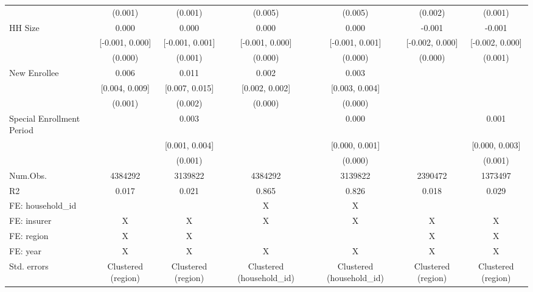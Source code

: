 \begin{table}[H]
\begin{table}[H]
\begin{tabular}[t]{lcccccc}
 & (0.001) & (0.001) & (0.005) & (0.005) & (0.002) & (0.001)\\
HH Size & 0.000 & 0.000 & 0.000 & 0.000 & -0.001 & -0.001\\
 & [-0.001, 0.000] & [-0.001, 0.001] & [-0.001, 0.000] & [-0.001, 0.001] & [-0.002, 0.000] & [-0.002, 0.000]\\
 & (0.000) & (0.001) & (0.000) & (0.000) & (0.000) & (0.001)\\
New Enrollee & 0.006 & 0.011 & 0.002 & 0.003 &  & \\
 & [0.004, 0.009] & [0.007, 0.015] & [0.002, 0.002] & [0.003, 0.004] &  & \\
 & (0.001) & (0.002) & (0.000) & (0.000) &  & \\
Special Enrollment Period &  & 0.003 &  & 0.000 &  & 0.001\\
 &  & [0.001, 0.004] &  & [0.000, 0.001] &  & [0.000, 0.003]\\
 &  & (0.001) &  & (0.000) &  & (0.001)\\
\midrule
Num.Obs. & 4384292 & 3139822 & 4384292 & 3139822 & 2390472 & 1373497\\
R2 & 0.017 & 0.021 & 0.865 & 0.826 & 0.018 & 0.029\\
FE: household\_id &  &  & X & X &  & \\
FE: insurer & X & X & X & X & X & X\\
FE: region & X & X &  &  & X & X\\
FE: year & X & X & X & X & X & X\\
Std. errors & Clustered (region) & Clustered (region) & Clustered (household\_id) & Clustered (household\_id) & Clustered (region) & Clustered (region)\\
\bottomrule
\end{tabular}
\end{table}
\end{table}
